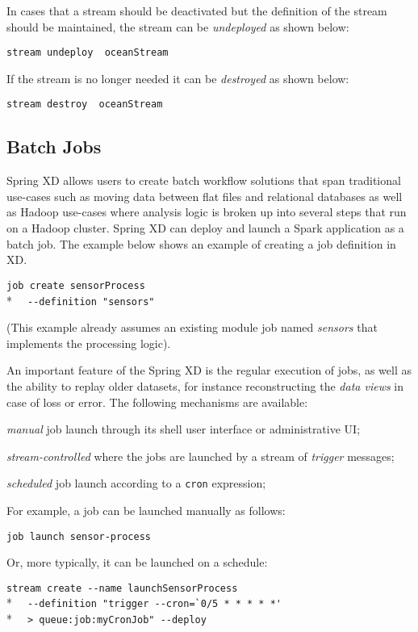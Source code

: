 In cases that a stream should be deactivated but the definition of the stream
should be maintained, the stream can be \emph{undeployed} as shown below:

\verb;stream undeploy  oceanStream ;

If the stream is no longer needed it can be \emph{destroyed} as shown below:

\verb;stream destroy  oceanStream ;

\subsection {Batch Jobs}

Spring XD allows users to create batch workflow solutions that span traditional
use-cases such as moving data between flat files and relational databases as
well as Hadoop use-cases where analysis logic is broken up into several steps
that run on a Hadoop cluster. Spring XD can deploy and launch a Spark application
as a batch job.  The example below shows an example of creating a
job definition in XD.

\verb;job create sensorProcess;\\*
\verb;  --definition "sensors";

(This example already assumes an existing module job named \emph{sensors} that
implements the processing logic).

An important feature of the Spring XD is the regular
execution of jobs, as well as the ability to replay older datasets, for
instance reconstructing the \emph{data views} in case of loss or error.
The following mechanisms are available:

\begin{itemize*}
\item \emph{manual} job launch through its shell user interface or
administrative UI;
\item \emph{stream-controlled} where the jobs are launched by a stream of
\emph{trigger} messages;
\item \emph{scheduled} job launch according to a \texttt{cron} expression;
\end{itemize*}

For example, a job can be launched manually as follows:

\verb;job launch sensor-process;

Or, more typically, it can be launched on a schedule:

\verb;stream create --name launchSensorProcess;\\*
\verb;  --definition "trigger --cron=`0/5 * * * * *';\\*
\verb;  > queue:job:myCronJob" --deploy;

